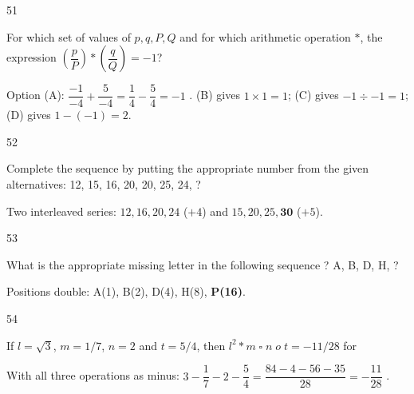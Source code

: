 \begin{question}{51}
{For which set of values of $p, q, P, Q$ and for which arithmetic operation $*$, the expression $\left(\dfrac{p}{P}\right)*\left(\dfrac{q}{Q}\right)=-1$?\par}
\begin{explain}
Option (A): $\dfrac{-1}{-4}+\dfrac{5}{-4}=\dfrac14-\dfrac54=-1$ \checkmark.
(B) gives $1\times1=1$; (C) gives $-1\div-1=1$; (D) gives $1-(-1)=2$.
\end{explain}
\end{question}

\begin{question}{52}
{Complete the sequence by putting the appropriate number from the given alternatives: 12, 15, 16, 20, 20, 25, 24, ?\par}
\begin{explain}
Two interleaved series: $12, 16, 20, 24$ ($+4$) and $15, 20, 25, \mathbf{30}$ ($+5$).
\end{explain}
\end{question}

\begin{question}{53}
{What is the appropriate missing letter in the following sequence ? A, B, D, H, ?\par}
\begin{explain}
Positions double: A(1), B(2), D(4), H(8), \textbf{P(16)}.
\end{explain}
\end{question}

\begin{question}{54}
{If $l=\sqrt3$, $m=1/7$, $n=2$ and $t=5/4$, then $l^2 * m \;\square\; n \;o\; t=-11/28$ for\par}
\begin{explain}
With all three operations as minus: $3-\dfrac17-2-\dfrac54=\dfrac{84-4-56-35}{28}=-\dfrac{11}{28}$ \checkmark.
\end{explain}
\end{question}

